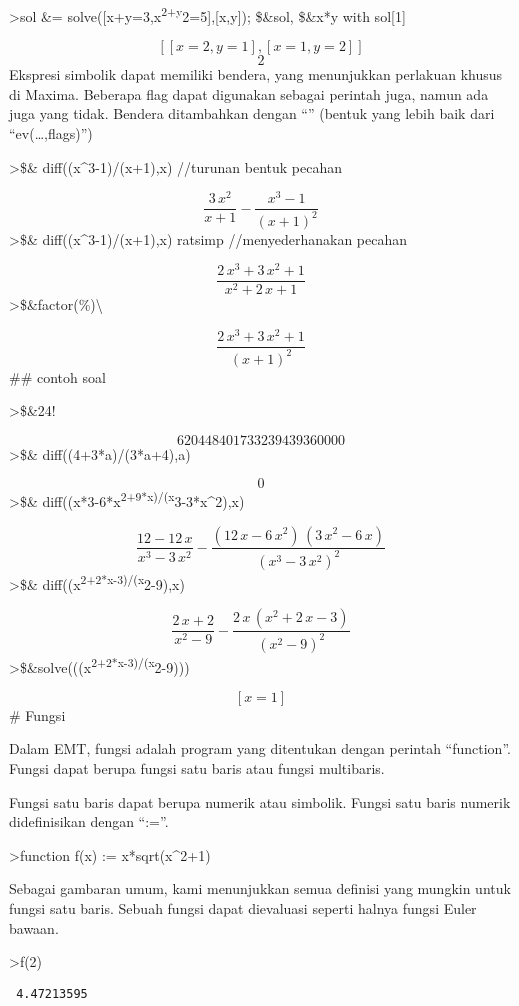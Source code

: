 \documentclass[
]{book}
\begin{document}
\textgreater sol \&= solve({[}x+y=3,x\textsuperscript{2+y}2=5{]},{[}x,y{]}); \$\&sol, \$\&x*y with sol{[}1{]}

\[\left[ \left[ x=2 , y=1 \right]  , \left[ x=1 , y=2 \right] 
  \right] \]\[2\]Ekspresi simbolik dapat memiliki bendera, yang menunjukkan perlakuan khusus di Maxima. Beberapa flag dapat digunakan sebagai perintah juga, namun ada juga yang tidak. Bendera ditambahkan dengan ``\textbar{}'' (bentuk yang lebih baik dari ``ev(\ldots,flags)'')

\textgreater\$\& diff((x\^{}3-1)/(x+1),x) //turunan bentuk pecahan

\[\frac{3\,x^2}{x+1}-\frac{x^3-1}{\left(x+1\right)^2}\]\textgreater\$\& diff((x\^{}3-1)/(x+1),x) \textbar{} ratsimp //menyederhanakan pecahan

\[\frac{2\,x^3+3\,x^2+1}{x^2+2\,x+1}\]\textgreater\$\&factor(\%)\textbackslash{}

\[\frac{2\,x^3+3\,x^2+1}{\left(x+1\right)^2}\]\#\# contoh soal

\textgreater\$\&24!

\[620448401733239439360000\]\textgreater\$\& diff((4+3*a)/(3*a+4),a)

\[0\]\textgreater\$\& diff((x*3-6*x\textsuperscript{2+9*x)/(x}3-3*x\^{}2),x)

\[\frac{12-12\,x}{x^3-3\,x^2}-\frac{\left(12\,x-6\,x^2\right)\,\left(
 3\,x^2-6\,x\right)}{\left(x^3-3\,x^2\right)^2}\]\textgreater\$\& diff((x\textsuperscript{2+2*x-3)/(x}2-9),x)

\[\frac{2\,x+2}{x^2-9}-\frac{2\,x\,\left(x^2+2\,x-3\right)}{\left(x^2
 -9\right)^2}\]\textgreater\$\&solve(((x\textsuperscript{2+2*x-3)/(x}2-9)))

\[\left[ x=1 \right] \]\# Fungsi

Dalam EMT, fungsi adalah program yang ditentukan dengan perintah ``function''. Fungsi dapat berupa fungsi satu baris atau fungsi multibaris.

Fungsi satu baris dapat berupa numerik atau simbolik. Fungsi satu baris numerik didefinisikan dengan ``:=''.

\textgreater function f(x) := x*sqrt(x\^{}2+1)

Sebagai gambaran umum, kami menunjukkan semua definisi yang mungkin untuk fungsi satu baris. Sebuah fungsi dapat dievaluasi seperti halnya fungsi Euler bawaan.

\textgreater f(2)

\begin{verbatim}
 4.47213595 
\end{verbatim}
\end{document}
